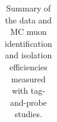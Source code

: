 \begin{table}[htb]
\begin{center}
\scriptsize
\caption{\label{tab:mutnpeff}
Summary of the data and MC muon identification and isolation efficiencies measured with tag-and-probe studies.}
\begin{tabular}{c|c|c|c}




\end{tabular}
\end{center}
\end{table}
